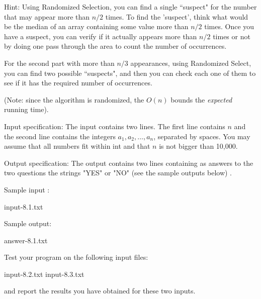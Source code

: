 \documentclass[11pt]{article}
\begin{document}
Hint: Using \textsf{Randomized Selection}, you can find a single ``suspect" for the number that may appear more than $n/2$ times. To find the 'suspect', think what  would be the median of an array containing some value more than $n/2$ times. Once you have a suspect, you can verify if it actually appears more than $n/2$ times or not by doing one pass through the area to count the number of occurrences.

For the second part with more than $n/3$ appearances, using Randomized Select, you can find two possible ``suspects", and then you can check each one of them to see if it has the required number of occurrences.
\medskip

 (Note: since the algorithm is randomized, the $O(n)$ bounds the \emph{expected} running time). 
\medskip


Input specification: The input contains two lines. The first line contains $n$ and the second line contains the integers $a_1,a_2,\ldots, a_n$, separated by spaces. You may assume that all numbers fit within int and that $n$ is not bigger than 10,000. 

Output specification: The output contains two lines  containing as answers to the two questions  the strings "YES" or "NO" (see the sample outputs below) . 





Sample input :


 
   input-8.1.txt
  



Sample output:
 
 answer-8.1.txt


\medskip

Test your program on the following input files:

input-8.2.txt
 input-8.3.txt  


and report the results you have obtained for these two inputs.
\end{document}
